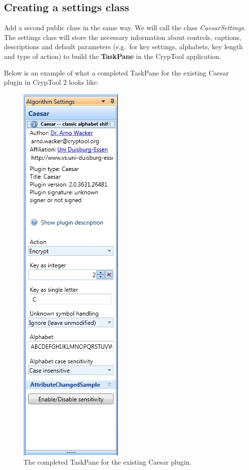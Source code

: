 \subsection{Creating a settings class}
\label{sec:CreatingASettingsClass}

Add a second public class in the same way. We will call the class \textit{CaesarSettings}. The settings class will store the necessary information about controls, captions, descriptions and default parameters (e.g.\ for key settings, alphabets, key length and type of action) to build the \textbf{TaskPane} in the CrypTool application.
\clearpage

\noindent Below is an example of what a completed TaskPane for the existing Caesar plugin in CrypTool 2 looks like:

\begin{figure}[h!]
	\centering
		\includegraphics{figures/task_pane.jpg}
	\caption{The completed TaskPane for the existing Caesar plugin.}
	\label{fig:task_pane}
\end{figure}
\clearpage

